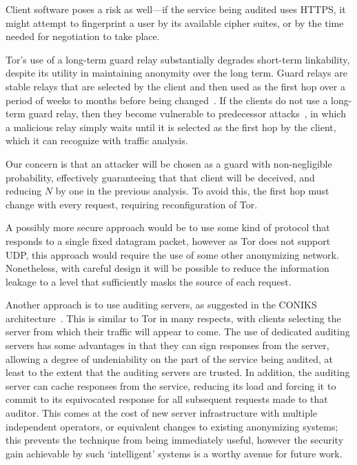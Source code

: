 \documentclass[USenglish]{llncs}
\begin{document}
Client software poses a risk as well---if the service being audited
uses HTTPS, it might attempt to fingerprint a user by its
available cipher suites, or by the time needed for negotiation to
take place.

Tor's use of a long-term guard relay substantially degrades short-term linkability,
despite its utility in maintaining anonymity over the long term.  Guard relays are
stable relays that are selected by the client and then used as the first hop over
a period of weeks to months before being changed~\cite{elahi-changing-of-the-guards}.
If the clients do not use a long-term guard relay, then they become vulnerable to
predecessor attacks~\cite{predecessor-attack}, in which a malicious relay simply
waits until it is selected as the first hop by the client, which it can recognize
with traffic analysis.  

Our concern is that an attacker will be chosen as a
guard with non-negligible probability, effectively guaranteeing that that client will be deceived,
and reducing $N$  by one in the previous analysis.  To avoid this,
the first hop must change with every request, requiring reconfiguration of Tor.

A possibly more secure approach would be to use some kind of protocol that responds to a
single fixed datagram packet, however as Tor does not support UDP,
this approach would require the use of some other anonymizing network.
Nonetheless, with careful design it will be possible to reduce the
information leakage to a level that sufficiently masks the source of each
request.

Another approach is to use auditing servers, as suggested in the CONIKS
architecture~\cite{coniks}.  This is similar to Tor in many respects, with
clients selecting the server from which their traffic will appear to come.  The use
of dedicated auditing servers has some advantages in that they can
sign responses from the server, allowing a degree of undeniability on
the part of the service being audited, at least to the extent that
the auditing servers are trusted.  In addition, the auditing server can cache responses from the
service, reducing its load and forcing it to commit to its equivocated response
for all subsequent requests made to that auditor.  This comes at the cost
of new server infrastructure with multiple independent operators, or
equivalent changes to existing anonymizing systems; this prevents the technique
from being immediately useful, however the security gain achievable by such
`intelligent' systems is a worthy avenue for future work.
\end{document}
